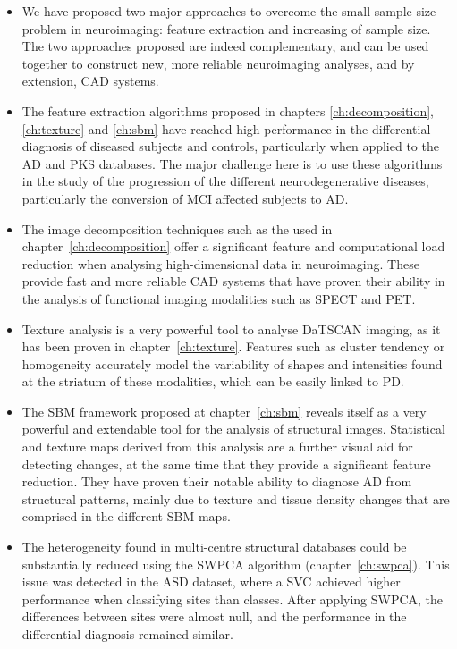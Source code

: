 \begin{itemize}
	\item We have proposed two major approaches to overcome the small sample size problem in neuroimaging: feature extraction and increasing of sample size. The two approaches proposed are indeed complementary, and can be used together to construct new, more reliable neuroimaging analyses, and by extension, \ac{CAD} systems. 
	\item The feature extraction algorithms proposed in chapters \ref{ch:decomposition}, \ref{ch:texture} and \ref{ch:sbm} have reached high performance in the differential diagnosis of diseased subjects and controls, particularly when applied to the \ac{AD} and \ac{PKS} databases. The major challenge here is to use these algorithms in the study of the progression of the different neurodegenerative diseases, particularly the conversion of \ac{MCI} affected subjects to \ac{AD}. 
	\item The image decomposition techniques such as the used in chapter~\ref{ch:decomposition} offer a significant feature and computational load reduction when analysing high-dimensional data in neuroimaging. These provide fast and more reliable \ac{CAD} systems that have proven their ability in the analysis of functional imaging modalities such as \ac{SPECT} and \ac{PET}. 
	\item Texture analysis is a very powerful tool to analyse DaTSCAN imaging, as it has been proven in chapter~\ref{ch:texture}. Features such as cluster tendency or homogeneity accurately model the variability of shapes and intensities found at the striatum of these modalities, which can be easily linked to \ac{PD}. 
	\item The \ac{SBM} framework proposed at chapter~\ref{ch:sbm} reveals itself as a very powerful and extendable tool for the analysis of structural images. Statistical and texture maps derived from this analysis are a further visual aid for detecting changes, at the same time that they provide a significant feature reduction. They have proven their notable ability to diagnose \ac{AD} from structural patterns, mainly due to texture and tissue density changes that are comprised in the different \ac{SBM} maps. 
	\item The heterogeneity found in multi-centre structural databases could be substantially reduced using the \ac{SWPCA} algorithm (chapter~\ref{ch:swpca}). This issue was detected in the \aimsmri{} \ac{ASD} dataset, where a \ac{SVC} achieved higher performance when classifying sites than classes. After applying \ac{SWPCA}, the differences between sites were almost null, and the performance in the differential diagnosis remained similar. 

\end{itemize}
